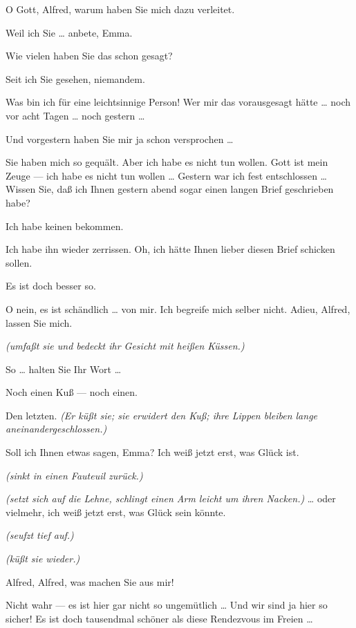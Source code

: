 \documentclass[
	final,
	a4paper,
	ngerman,
	mpinclude = true, %
	twoside = true,
	open = right,
	cleardoublepage = plain,
	DIV = 13,
	BCOR = 1cm,
	titlepage = firstiscover,
	]{scrbook}
\newcommand{\direction}[1]{\textit{(#1)}}
\newcommand{\thecharacter}[1]{\textup{\textsc{#1}}\xspace}
\newcommand{\theherr}{\thecharacter{Junger Herr}}
\newcommand{\thefrau}{\thecharacter{Junge Frau}}
\newcommand{\character}[1]{\item[#1:]}
\newcommand{\herr}{\character{\theherr}}
\newcommand{\frau}{\character{\thefrau}}
\begin{document}
\begin{play}
	\frau
	O Gott, Alfred, warum haben Sie mich dazu verleitet.

	\herr
	Weil ich Sie \ldots{} anbete, Emma.

	\frau
	Wie vielen haben Sie das schon gesagt?

	\herr
	Seit ich Sie gesehen, niemandem.

	\frau
	Was bin ich für eine leichtsinnige Person! Wer mir das vorausgesagt hätte \ldots{} noch vor acht Tagen \ldots{} noch gestern \ldots{}

	\herr
	Und vorgestern haben Sie mir ja schon versprochen \ldots{}

	\frau
	Sie haben mich so gequält. Aber ich habe es nicht tun wollen. Gott ist mein Zeuge --- ich habe es nicht tun wollen \ldots{} Gestern war ich fest entschlossen \ldots{} Wissen Sie, daß ich Ihnen gestern abend sogar einen langen Brief geschrieben habe?

	\herr
	Ich habe keinen bekommen.

	\frau
	Ich habe ihn wieder zerrissen. Oh, ich hätte Ihnen lieber diesen Brief schicken sollen.

	\herr
	Es ist doch besser so.

	\frau
	O nein, es ist schändlich \ldots{} von mir. Ich begreife mich selber nicht. Adieu, Alfred, lassen Sie mich.

	\herr
	\direction{umfaßt sie und bedeckt ihr Gesicht mit heißen Küssen.}

	\frau
	So \ldots{} halten Sie Ihr Wort \ldots{}

	\herr
	Noch einen Kuß --- noch einen.

	\frau
	Den letzten. \direction{Er küßt sie; sie erwidert den Kuß; ihre Lippen bleiben lange aneinandergeschlossen.}

	\herr
	Soll ich Ihnen etwas sagen, Emma? Ich weiß jetzt erst, was Glück ist.

	\frau
	\direction{sinkt in einen Fauteuil zurück.}

	\herr
	\direction{setzt sich auf die Lehne, schlingt einen Arm leicht um ihren Nacken.} \ldots{} oder vielmehr, ich weiß jetzt erst, was Glück sein könnte.

	\frau
	\direction{seufzt tief auf.}

	\herr
	\direction{küßt sie wieder.}

	\frau
	Alfred, Alfred, was machen Sie aus mir!

	\herr
	Nicht wahr --- es ist hier gar nicht so ungemütlich \ldots{} Und wir sind ja hier so sicher! Es ist doch tausendmal schöner als diese Rendezvous im Freien \ldots{}


\end{play}
\end{document}

